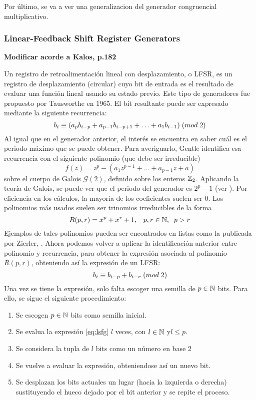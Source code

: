 Por último, se va a ver una generalizacion del generador congruencial multiplicativo.


\subsubsection{Linear-Feedback Shift Register Generators}

\textbf{Modificar acorde a Kalos, p.182}

Un registro de retroalimentación lineal con desplazamiento, o LFSR, es un registro de desplazamiento (circular) cuyo bit de entrada es el resultado de evaluar una función lineal usando su estado previo. Este tipo de generadores fue propuesto por Tausworthe en 1965. El bit resultante puede ser expresado mediante la siguiente recurrencia:
\begin{equation}
b_i \equiv (a_{p}b_{i-p}+a_{p-1}b_{i-p+1}+\ldots+a_{1}b_{i-1}) \;(mod \; 2)
\end{equation}
Al igual que en el generador anterior, el interés se encuentra en saber cuál es el periodo máximo que se puede obtener. Para averiguarlo, Gentle identifica esa recurrencia con el siguiente polinomio (que debe ser irreducible)
\[
f(z)=z^p-(a_{1}z^{p-1}+\ldots+a_{p-1}z+a)
\]
sobre el cuerpo de Galois $\mathcal{G}(2)$, definido sobre los enteros $\mathbb{Z}_2$. Aplicando la teoría de Galois, se puede ver que el periodo del generador es $2^p-1$ (ver \cite{gentle2006random}). Por eficiencia en los cálculos, la mayoría de los coeficientes suelen ser 0. Los polinomios más usados suelen ser trinomios irreducibles de la forma
\[
R(p,r)=x^p+x^r+1, \;\;\; p,r\in\mathbb{N}, \;\; p>r
\]
Ejemplos de tales polinomios pueden ser encontrados en listas como la publicada por Zierler, \cite{zierler1969}. 
Ahora podemos volver a aplicar la identificación anterior entre polinomio y recurrencia, para obtener la expresión asociada al polinomio $R(p,r)$, obteniendo así la expresión de un LFSR:
\begin{equation}\label{eq:lsfg}
b_i \equiv b_{i-p}+b_{i-r} \;(mod \; 2)
\end{equation}
Una vez se tiene la expresión, solo falta escoger una semilla de $p\in\mathbb{N}$ bits. Para ello, se sigue el siguiente procedimiento:
\begin{enumerate}
\item Se escogen $p\in\mathbb{N}$ bits como semilla inicial.
\item Se evalua la expresión \ref{eq:lsfg} $l$ veces, con $l\in\mathbb{N}$ y$l\leq p$.
\item Se considera la tupla de $l$ bits como un número en base 2 
\item Se vuelve a evaluar la expresión, obteniendose así un nuevo bit.
\item Se desplazan los bits actuales un lugar (hacia la izquierda o derecha) sustituyendo el hueco dejado por el bit anterior y se repite el proceso.
\end{enumerate}
